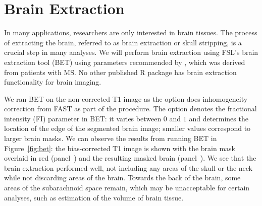 \section{Brain Extraction}
In many applications, researchers are only interested in brain tissues.  The process of extracting the brain, referred to as brain extraction or skull stripping, is a crucial step in many analyses.  We will perform brain extraction using FSL's brain extraction tool (BET) \citep{smith_fast_2002, jenkinson_bet2:_2005} using parameters recommended by \citet{popescu_optimizing_2012}, which was derived from patients with MS.  No other published R package has brain extraction functionality for brain imaging.  
 


\begin{knitrout}
\color{fgcolor}\begin{kframe}
\begin{alltt}
\hlstd{(} \hlstd{=}  \hlstd{,}
        \hlstd{=} \hlstd{,}
        \hlstd{=} \hlstd{,}  
        \hlstd{=} \hlstd{,}
       \hlstd{=}\hlstd{)}
\end{alltt}
\end{kframe}
\end{knitrout}


We ran BET on the non-corrected T1 image as the  option does inhomogeneity correction from FAST as part of the procedure.  The option  denotes the fractional intensity (FI) parameter in BET: it varies between $0$ and $1$ and determines the location of the edge of the segmented brain image; smaller values correspond to larger brain masks. We can observe the results from running BET in Figure~\ref{fig:bet}: the bias-corrected T1 image is shown with the brain mask overlaid in red (panel~\protect{}) and the resulting masked brain (panel~\protect{}).  We see that the brain extraction performed well, not including any areas of the skull or the neck while not discarding areas of the brain.  Towards the back of the brain, some areas of the subarachnoid space remain, which may be unacceptable for certain analyses, such as estimation of the volume of brain tissue.



